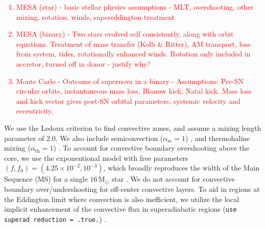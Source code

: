 \documentclass[linenumbers,trackchanges,twocolumn]{aastex701}
\newcommand{\Mdot}{\mathrm{M}_{\odot}}
\newcommand{\red}{\textcolor{red}}
\begin{document}
\red{
\begin{enumerate}
    \item MESA (star) - basic stellar physics assumptions - MLT, overshooting, other mixing, rotation, winds, supereddington treatment
    \item MESA (binary) - Two stars evolved self consistently, along with orbit equations. Treatment of mass transfer (Kolb \& Ritter), AM transport, loss from system, tides, rotationally enhanced winds. Rotation only included in accretor, turned off in donor - justify why? 
    \item Monte Carlo - Outcome of supernova in a binary - Assumptions: Pre-SN circular orbits, instantaneous mass loss, Blauuw kick, Natal kick. Mass loss and kick vector gives post-SN orbital parameters, systemic velocity and eccentricity.
\end{enumerate}
}

We use the Ledoux criterion \cite{1947ApJ...105..305L} to find convective zones, and assume a mixing length parameter of 2.0. We also include semiconvection ($\alpha_{\mathrm{sc}}=1$) \cite{1983A&A...126..207L}, and thermohaline mixing ($\alpha_{\mathrm{th}}=1$) \cite{1980A&A....91..175K}. To account for convective boundary overshooting above the core, we use the exponentional model with free parameters $(f,f_0) = (4.25 \times 10^{-2}, 10^{-3})$, which broadly reproduces the width of the Main Sequence (MS) for a single $16 \, \Mdot$ star \cite{2011A&A...530A.115B}. We do not account for convective boundary over/undershooting for off-center convective layers. To aid in regions at the Eddington limit where convection is also inefficient, we utilize the local implicit enhancement of the convective flux in superadiabatic regions (\texttt{use superad reduction = .true.}) \cite{2023ApJS..265...15J}.
\end{document}
